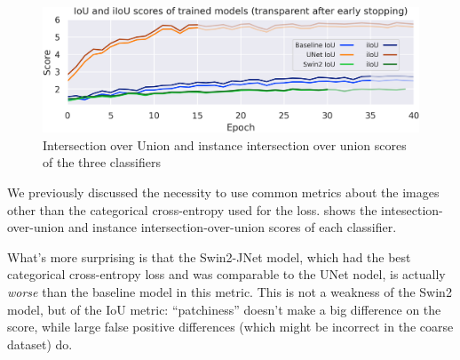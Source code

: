 \begin{figure}[h]
	\centering
	\includegraphics[width=.9\textwidth]{iou_scores.png}
	\caption{Intersection over Union and instance intersection over union scores of the three classifiers}
	\label{comparisons}
\end{figure}

We previously discussed the necessity to use common metrics about the images other than the categorical cross-entropy used for the loss.
 shows the intesection-over-union and instance intersection-over-union scores of each classifier.


What's more surprising is that the Swin2-JNet model, which had the best categorical cross-entropy loss and was comparable to the UNet nodel, is actually \emph{worse} than the baseline model in this metric.
This is not a weakness of the Swin2 model, but of the IoU metric: ``patchiness'' doesn't make a big difference on the score, while large false positive differences (which might be incorrect in the coarse dataset) do.

